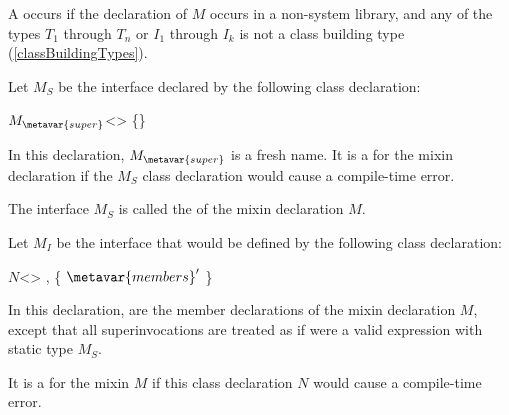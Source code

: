 \documentclass[makeidx]{article}
\begin{document}
\LMHash{}%
A  occurs if
the declaration of $M$ occurs in a non-system library,
and any of the types $T_1$ through $T_n$
or $I_1$ through $I_k$ is not a class building type
(\ref{classBuildingTypes}).

\LMHash{}%
Let $M_S$ be the interface declared by the following class declaration:

\begin{normativeDartCode}
\ABSTRACT{} \CLASS{} $M_{\metavar{super}}$<\TypeParametersStd{}>
    \IMPLEMENTS{}  \{\}
\end{normativeDartCode}

\LMHash{}%
In this declaration, $M_{\metavar{super}}$ is a fresh name.
It is a  for the mixin declaration if the $M_S$
class declaration would cause a compile-time error.


\LMHash{}%
The interface $M_S$ is called the
of the mixin declaration $M$.


\LMHash{}%
Let $M_I$ be the interface that would be defined by
the following class declaration:

\begin{normativeDartCode}
\ABSTRACT{} \CLASS{} $N$<\TypeParametersStd>
    \IMPLEMENTS{} ,  \{
  $\metavar{members}'$
\}
\end{normativeDartCode}

\LMHash{}%
In this declaration,  are
the member declarations of the mixin declaration $M$,
except that all superinvocations are treated
as if \SUPER{} were a valid expression with static type $M_S$.

\LMHash{}%
It is a
 for the mixin $M$ if this class declaration $N$
would cause a compile-time error.

\end{document}
